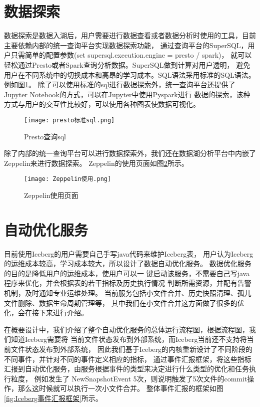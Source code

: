 \section{数据探索}

数据探索是数据入湖后，用户需要进行数据查看或者数据分析时使用的工具，目前主要依赖内部的统一查询平台实现数据探索功能，
通过查询平台的SuperSQL，用户只需简单的配置参数(set supersql.execution.engine = presto / spark)，
就可以轻松通过Presto或者Spark查询分析数据。SuperSQL做到计算对用户透明，
避免用户在不同系统中的切换成本和高昂的学习成本。SQL语法采用标准的SQL语法。例如图\ref{fig:presto标准sql}。
除了可以使用标准的sql进行数据探索外，统一查询平台还提供了Jupyter Notebook的方式，可以在Jupyter中使用Pyspark进行
数据的探索，该种方式与用户的交互性比较好，可以使用各种图表使数据可视化。

\begin{figure}[H]
  \centering
  \texttt{[image: presto标准sql.png]}
  \caption{Presto查询sql}
  \label{fig:presto标准sql}
\end{figure}

除了内部的统一查询平台可以进行数据探索外，我们还在数据湖分析平台中内嵌了Zeppelin来进行数据探索。
Zeppelin的使用页面如图\ref{fig:Zeppelin使用}所示。

\begin{figure}[H]
  \centering
  \texttt{[image: Zeppelin使用.png]}
  \caption{Zeppelin使用页面}
  \label{fig:Zeppelin使用}
\end{figure}

\section{自动优化服务}

目前使用Iceberg的用户需要自己手写java代码来维护Iceberg表，
用户认为Iceberg的运维成本较高，学习成本较大，所以设计了数据自动优化服务。
数据优化服务的目的是降低用户的运维成本，使用户可以一
键启动该服务，不需要自己写java程序来优化，并会根据表的若干指标及历史执行情况
判断所需资源，并配有告警机制，及时通知专业运维处理。
当前服务包括小文件合并、历史快照清理、孤儿文件删除、数据生命周期管理等，
其中我们在小文件合并这方面做了很多的优化，会在接下来进行介绍。

在概要设计中，我们介绍了整个自动优化服务的总体运行流程图，根据流程图，我们知道Iceberg需要将
当前文件状态发布到外部系统，而Iceberg当前还不支持将当前文件状态发布到外部系统，
因此我们基于Iceberg的内核重新设计了不同阶段的不同事件，并针对不同的事件定义相应的指标，
通过事件汇报框架，将这些指标汇报到自动优化服务，由服务根据事件的类型来决定进行什么类型的优化和任务执行粒度，
例如发生了 NewSnapshotEvent 5次，则说明触发了5次文件的commit操作，那么这时候就可以执行一次小文件合并。
整体事件汇报的框架如图\ref{fig:Iceberg事件汇报框架}所示。


